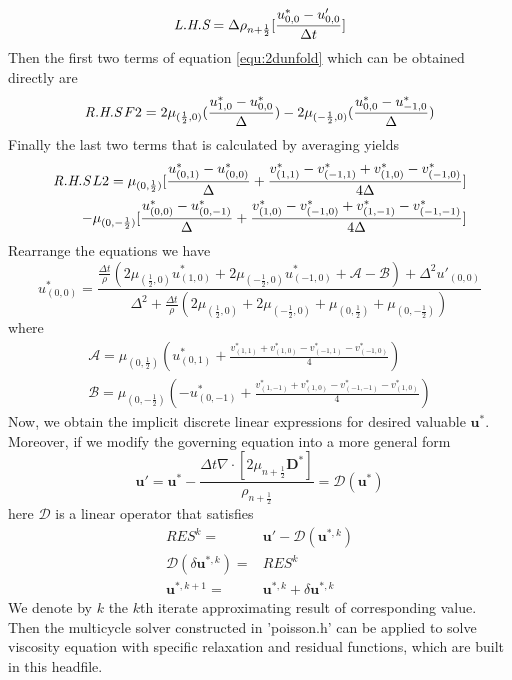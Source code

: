 \documentclass[a4paper]{article}
\begin{document}
\begin{equation}
  \emph{L.H.S}=\Delta\rho_{n+ \frac{1}{2}}[ \frac{u^*_{0,0}-u'_{0,0}}{\Delta t}]
\end{equation}
Then the first two terms of equation \ref{equ:2dunfold} which can be obtained directly are
\begin{equation}
  \emph{R.H.S}\,F2 =  2\mu_{(\frac{1}{2},0)}(\frac{u^*_{1,0}-u^*_{0,0}}{\Delta})-2\mu_{(-\frac{1}{2},0)}(\frac{u^*_{0,0}-u^*_{-1,0}}{\Delta})
\end{equation}
Finally the last two terms that is calculated by averaging yields
\begin{equation}
\begin{aligned}
  \emph{R.H.S}\,L2 = 
    \mu_{(0,\frac{1}{2})}[\frac{u^*_{(0,1)}-u^*_{(0,0)}}{\Delta}
    +\frac{v^*_{(1,1)}-v^*_{(-1,1)}+v^*_{(1,0)}-v^*_{(-1,0)}}{4\Delta}]\\-\mu_{(0,-\frac{1}{2})}[\frac{u^*_{(0,0)}-u^*_{(0,-1)}}{\Delta}+\frac{v^*_{(1,0)}-v^*_{(-1,0)}+v^*_{(1,-1)}-v^*_{(-1,-1)}}{4\Delta}]
\end{aligned}
\end{equation}
Rearrange the equations we have
\begin{equation}\label{equ:aim}
    u^*_{(0,0)} = \frac{\frac{\Delta t}{\rho}(2\mu_{(\frac{1}{2},0)}u^*_{(1,0)}+2\mu_{(-\frac{1}{2},0)}u^*_{(-1,0)}+\mathscr{A}-\mathscr{B})+\Delta^2 u'_{(0,0)}}{\Delta^2+\frac{\Delta t}{\rho}(2\mu_{(\frac{1}{2},0)}+2\mu_{(-\frac{1}{2},0)}+\mu_{(0,\frac{1}{2})}+\mu_{(0,-\frac{1}{2})})}
\end{equation}
where
\begin{gather}
    \mathscr{A} = \mu_{(0,\frac{1}{2})}(u^*_{(0,1)}+\frac{v^*_{(1,1)}+v^*_{(1,0)}-v^*_{(-1,1)}-v^*_{(-1,0)}}{4})\\
    \mathscr{B} = \mu_{(0,-\frac{1}{2})}(-u^*_{(0,-1)}+\frac{v^*_{(1,-1)}+v^*_{(1,0)}-v^*_{(-1,-1)}-v^*_{(1,0)}}{4})
\end{gather}
Now, we obtain the implicit discrete linear expressions for desired valuable $ \mathbf{u}^*$. Moreover, if we modify the governing equation into a more general form
\begin{equation}\label{equ:resi}
  \mathbf{u}' = \mathbf{u}^* - \frac{\Delta t\nabla\cdot[2 \mu_{n+ \frac{1}{2}} \mathbf{D}^*]}{\rho_{n + \frac{1}{2}}} = \mathscr{D}( \mathbf{u}^*)
\end{equation}
here $\mathscr{D}$ is a linear operator that satisfies
\begin{align}
  RES^k =& \mathbf{u}'- \mathscr{D}( \mathbf{u}^{*,k}) \\
  \mathscr{D}(\delta \mathbf{u}^{*,k}) =& RES^k \label{equ:delta}\\
  \mathbf{u}^{*,k+1} =& \mathbf{u}^{*,k}+ \delta\mathbf{u}^{*,k}
\end{align}
We denote by $k$ the $k$th iterate approximating result of corresponding value. Then the multicycle solver constructed in 'poisson.h' can be applied to solve viscosity equation with specific relaxation and residual functions, which are built in this headfile. 
\end{document}
